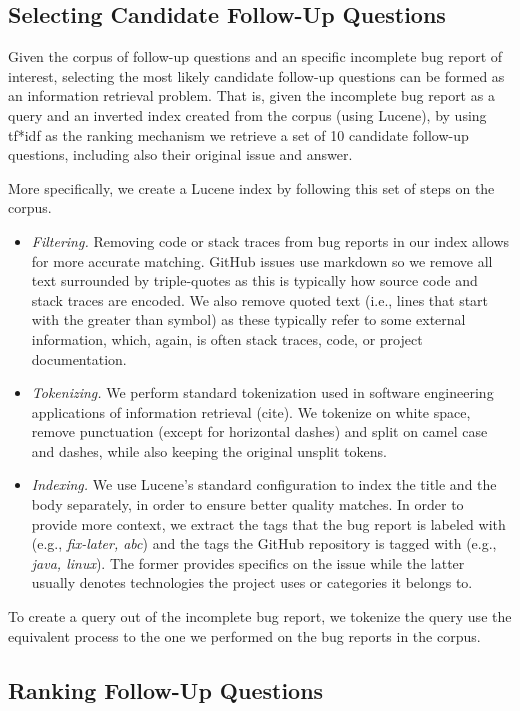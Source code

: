 \subsection{Selecting Candidate Follow-Up Questions}

Given the corpus of follow-up questions and an specific incomplete bug report of interest, selecting the
most likely candidate follow-up questions can be formed as an information retrieval
problem. That is, given the incomplete bug report as a query and an inverted index
created from the corpus (using Lucene), by using tf*idf as the ranking mechanism we
retrieve a set of 10 candidate follow-up questions, including also their original issue
and answer.

More specifically, we create a Lucene index by following this set of steps
on the corpus.
\begin{itemize}
\item {\em Filtering.} Removing code or stack traces from bug reports in our index allows
for more accurate matching. GitHub issues use markdown so we remove all text surrounded
by triple-quotes as this is typically how source code and stack traces are encoded. We also
remove quoted text (i.e., lines that start with the greater than symbol) as these typically
refer to some external information, which, again, is often stack traces, code, or project documentation.
\item {\em Tokenizing.} We perform standard tokenization used in software engineering applications
of information retrieval (cite). We tokenize on white space, remove punctuation (except for horizontal dashes)
and split on camel case and dashes, while also keeping the original unsplit tokens.
\item {\em Indexing.} We use Lucene's standard configuration to index the title and the body separately,
in order to ensure better quality matches. In order to provide more context, we extract the tags that the bug report
is labeled with (e.g., {\em fix-later, abc}) and the tags the GitHub repository is tagged with
(e.g., {\em java, linux}). The former provides specifics on the issue while the latter usually denotes
technologies the project uses or categories it belongs to.
\end{itemize}

To create a query out of the incomplete bug report, we tokenize the query use the equivalent process to
the one we performed on the bug reports in the corpus.


\subsection{Ranking Follow-Up Questions}

